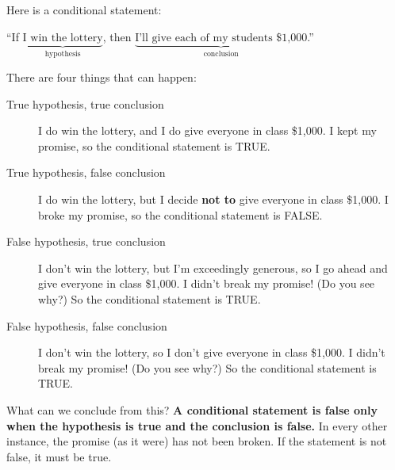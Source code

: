 \begin{example}
Here is a conditional statement:
\begin{center}
``If $\underbrace{\text{I win the lottery}}_{\text{hypothesis}}$, then $\underbrace{\text{I'll give  each of my students \$1,000}}_{\text{conclusion}}$.''
\end{center}

There are four things that can happen:
\begin{description}
\item[True hypothesis, true conclusion] I do win the lottery, and I do give everyone in class \$1,000.   I kept my promise, so the conditional statement is TRUE.
\item[True hypothesis, false conclusion] I do win the lottery, but I decide {\bf not to} give everyone in class \$1,000.   I broke my promise, so the conditional statement is FALSE.
\item[False hypothesis, true conclusion] I don't win the lottery, but I'm exceedingly generous, so I go ahead and give everyone in class \$1,000.  I didn't break my promise!  (Do you see why?)  So the conditional statement is TRUE.
\item[False hypothesis, false conclusion] I don't win the lottery,  so I don't give everyone in class \$1,000.  I didn't break my promise!  (Do you see why?)  So the conditional statement is TRUE.
\end{description}
\end{example}

What can we conclude from this?  {\bf A conditional statement is false only when the hypothesis is true and the conclusion is false.}  In every other instance, the promise (as it were) has not been broken.  If the statement is not false, it must be true.


